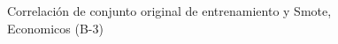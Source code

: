 \begin{figure}[H]
    \centering
    
    \caption{Correlación de conjunto original de entrenamiento y Smote, Economicos (B-3)}
    \label{pairwise-economicos-b-3-smote-enc}
\end{figure}